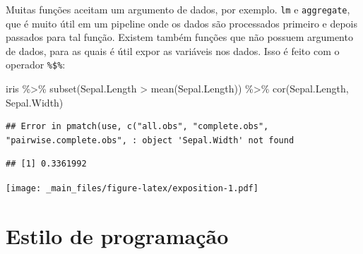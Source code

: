 \documentclass[
]{book}
\newenvironment{Shaded}{\begin{snugshade}}{\end{snugshade}}
\newcommand{\AttributeTok}[1]{\textcolor[rgb]{0.77,0.63,0.00}{#1}}
\newcommand{\DecValTok}[1]{\textcolor[rgb]{0.00,0.00,0.81}{#1}}
\newcommand{\FunctionTok}[1]{\textcolor[rgb]{0.00,0.00,0.00}{#1}}
\newcommand{\NormalTok}[1]{#1}
\newcommand{\SpecialCharTok}[1]{\textcolor[rgb]{0.00,0.00,0.00}{#1}}
\begin{document}
Muitas funções aceitam um argumento de dados, por exemplo. \texttt{lm} e \texttt{aggregate},
que é muito útil em um pipeline onde os dados são processados primeiro e depois
passados para tal função. Existem também funções que não possuem argumento de
dados, para as quais é útil expor as variáveis nos dados. Isso é feito com o
operador \texttt{\%\$\%}:

\begin{Shaded}
\begin{Highlighting}[]
\NormalTok{iris }\SpecialCharTok{\%\textgreater{}\%}
  \FunctionTok{subset}\NormalTok{(Sepal.Length }\SpecialCharTok{\textgreater{}} \FunctionTok{mean}\NormalTok{(Sepal.Length)) }\SpecialCharTok{\%\textgreater{}\%}
  \FunctionTok{cor}\NormalTok{(Sepal.Length, Sepal.Width)}
\end{Highlighting}
\end{Shaded}

\begin{verbatim}
## Error in pmatch(use, c("all.obs", "complete.obs", "pairwise.complete.obs", : object 'Sepal.Width' not found
\end{verbatim}

\begin{Shaded}
\end{Shaded}

\begin{verbatim}
## [1] 0.3361992
\end{verbatim}

\begin{Shaded}
\end{Shaded}

\texttt{[image: \_main\_files/figure-latex/exposition-1.pdf]}

\hypertarget{estilo-de-programauxe7uxe3o}{%
\section{Estilo de programação}\label{estilo-de-programauxe7uxe3o}}
\end{document}
